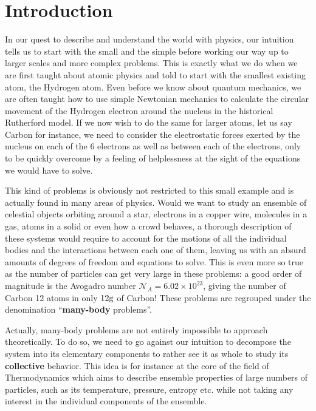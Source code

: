 \chapter*{Introduction}

\label{chap:intro}





In our quest to describe and understand the world with physics, our intuition tells us to start with the small and the simple before working our way up to larger scales and more complex problems. This is exactly what we do when we are first taught about atomic physics and told to start with the smallest existing atom, the Hydrogen atom. Even before we know about quantum mechanics, we are often taught how to use simple Newtonian mechanics to calculate the circular movement of the Hydrogen electron around the nucleus in the historical Rutherford model. If we now wish to do the same for larger atoms, let us say Carbon for instance, we need to consider the electrostatic forces exerted by the nucleus on each of the 6 electrons as well as between each of the electrons, only to be quickly overcome by a feeling of helplessness at the sight of the equations we would have to solve.


This kind of problems is obviously not restricted to this small example and is actually found in many areas of physics. Would we want to study an ensemble of celestial objects orbiting around a star, electrons in a copper wire, molecules in a gas, atoms in a solid or even how a crowd behaves, a thorough description of these systems would require to account for the motions of all the individual bodies and the interactions between each one of them, leaving us with an absurd amounts of degrees of freedom and equations to solve. This is even more so true as the number of particles can get very large in these problems: a good order of magnitude is the Avogadro number $\mathcal{N}_A = 6.02 \times 10^{23}$, giving the number of Carbon 12 atoms in only $12\rm{g}$ of Carbon! These problems are regrouped under the denomination ``\textbf{many-body} problems''. 


Actually, many-body problems are not entirely impossible to approach theoretically. To do so, we need to go against our intuition to decompose the system into its elementary components to rather see it as whole to study its \textbf{collective} behavior. This idea is for instance at the core of the field of Thermodynamics which aims to describe ensemble properties of large numbers of particles, such as its temperature, pressure, entropy etc. while not taking any interest in the individual components of the ensemble.

